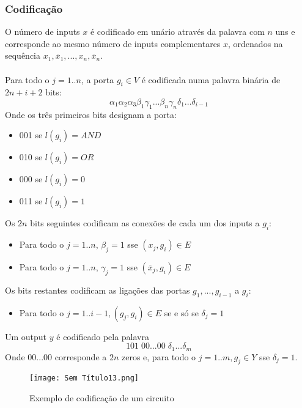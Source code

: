 \documentclass[10pt,a4paper]{report}
\begin{document}
\subsubsection{Codificação}
O número de inputs $x$ é codificado em unário através da palavra com $n$ uns e corresponde ao mesmo número de inputs complementares $x$, ordenados na sequência $x_1, \overline{x}_1, . . ., x_n, \overline{x}_n$.\\
\\
Para todo o $j = 1..n$, a porta $g_i \in V$ é codificada numa palavra binária de $2n + i + 2$ bits:
$$
\alpha_1\alpha_2\alpha_3\beta_1\gamma_1...\beta_n\gamma_n\delta_1...\delta_{i-1}
$$
Onde os três primeiros bits designam a porta:
\begin{itemize}
\item 001 se $l(g_i) = AND$
\item 010 se $l(g_i) = OR$
\item 000 se $l(g_i) = 0$
\item 011 se $l(g_i) = 1$
\end{itemize}
Os $2n$ bits seguintes codificam as conexões de cada um dos inputs a $g_i$:
\begin{itemize}
\item Para todo o $j = 1..n$, $\beta_j = 1$ sse $(x_j,g_i) \in E$
\item Para todo o $j = 1..n$, $\gamma_j = 1$ sse $(\overline{x}_j,g_i) \in E$
\end{itemize}
Os bits restantes codificam as ligações das portas $g_1, ..., g_{i-1}$ a $g_i$:
\begin{itemize}
\item Para todo o $j = 1..i - 1, (g_j, g_i) \in E$ se e só se $\delta_j = 1$
\end{itemize}
Um output $y$ é codificado pela palavra
$$
101 \; 00...00 \; \delta_1...\delta_m
$$
Onde $00...00$ corresponde a $2n$ zeros e, para todo o $j = 1..m, g_j \in Y$ sse $\delta_j = 1$.
\begin{figure}[H]
\centering
\texttt{[image: Sem Título13.png]}
\caption{Exemplo de codificação de um circuito}
\end{figure}
\end{document}

